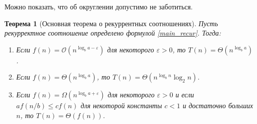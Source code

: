 \documentclass[11pt,draft]{article}
\newtheorem{theorem}{Теорема}[section]
\begin{document}
Можно показать, что об округлении допустимо не заботиться.
\begin{theorem}[Основная теорема о рекуррентных соотношениях]
 Пусть рекурректное соотношение определено формулой  
 \eqref{main_recur}. Тогда:
 \begin{enumerate}
   \item Если  $f(n) = \mathcal O\left(n^{\log_b a-\varepsilon}\right)$ для некоторого $\varepsilon > 0$, то
     $T(n) = \Theta\left(n^{\log_b a}\right)$.
   \item Если $f(n) =  \Theta \left(n^{\log_b a}\right)$, то $T(n) = \Theta\left(n^{\log_b n} \log_2 n \right)$.
   \item Если $f(n) = \Omega \left(n^{\log_b a + \varepsilon} \right)$ для некоторого $\varepsilon > 0$ и если $a f(n / b) \leqslant c f(n)$
     для некоторой константы $c < 1$ и достаточно больших $n$, то $T(n) = \Theta(f(n))$.
 \end{enumerate}
\end{theorem}
\end{document}
